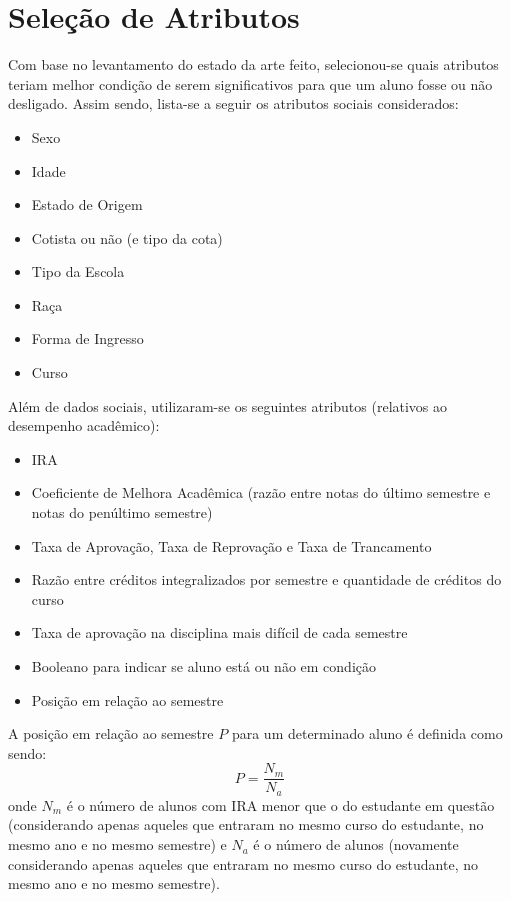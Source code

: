 \section{Seleção de Atributos}
Com base no levantamento do estado da arte feito, selecionou-se quais atributos
teriam melhor condição de serem significativos para que um aluno fosse ou não
desligado. Assim sendo, lista-se a seguir os atributos sociais considerados:
\begin{itemize}
        \item Sexo
        \item Idade
        \item Estado de Origem
        \item Cotista ou não (e tipo da cota)
        \item Tipo da Escola 
        \item Raça
        \item Forma de Ingresso
        \item Curso
\end{itemize}

Além de dados sociais, utilizaram-se os seguintes atributos (relativos ao desempenho
acadêmico): 
\begin{itemize}
    \item IRA
    \item Coeficiente de Melhora Acadêmica (razão entre notas do último semestre e
        notas do penúltimo semestre)
    \item Taxa de Aprovação, Taxa de Reprovação e Taxa de Trancamento
    \item Razão entre créditos integralizados por semestre e quantidade de créditos
        do curso
    \item Taxa de aprovação na disciplina mais difícil de cada semestre
    \item Booleano para indicar se aluno está ou não em condição
    \item Posição em relação ao semestre
\end{itemize}
A posição em relação ao semestre $P$ para um determinado aluno é definida como sendo:
\begin{equation}
    P = \frac{N_m}{N_a}
\end{equation}
onde $N_m$ é o número de alunos com IRA menor que o do estudante em questão
(considerando apenas aqueles que entraram no mesmo curso do estudante, no mesmo ano e
no mesmo semestre) e $N_a$ é o número de alunos (novamente considerando apenas
aqueles que entraram no mesmo curso do estudante, no mesmo ano e no mesmo semestre). 

